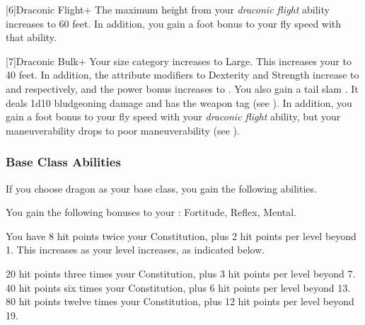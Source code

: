             [6]{Draconic Flight+} The maximum height from your \textit{draconic flight} ability increases to 60 feet.
            In addition, you gain a  foot bonus to your fly speed with that ability.

            [7]{Draconic Bulk+} Your size category increases to Large.
            This increases your  to 40 feet.
            In addition, the attribute modifiers to Dexterity and Strength increase to  and  respectively, and the power bonus increases to .
            You also gain a tail slam .
            It deals 1d10 bludgeoning damage and has the  weapon tag (see ).
            In addition, you gain a  foot bonus to your fly speed with your \textit{draconic flight} ability, but your maneuverability drops to poor maneuverability (see ).

        \subsubsection{Base Class Abilities}
            If you choose dragon as your base class, you gain the following abilities.

            You gain the following bonuses to your :  Fortitude,  Reflex,  Mental.

                You have 8 hit points \add twice your Constitution, plus 2 hit points per level beyond 1.
                This increases as your level increases, as indicated below.
                \begin{itemize}
                     20 hit points \add three times your Constitution, plus 3 hit points per level beyond 7.
                     40 hit points \add six times your Constitution, plus 6 hit points per level beyond 13.
                     80 hit points \add twelve times your Constitution, plus 12 hit points per level beyond 19.
                \end{itemize}


